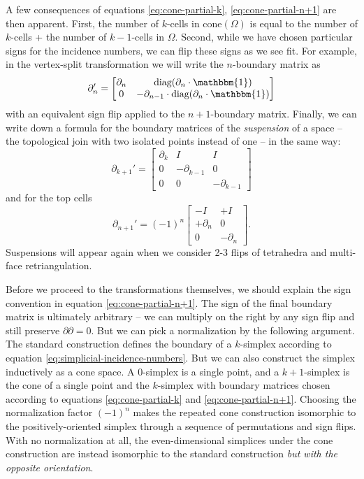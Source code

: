 \documentclass[twocolumn]{article}
\begin{document}
A few consequences of equations \eqref{eq:cone-partial-k}, \eqref{eq:cone-partial-n+1} are then apparent.
First, the number of $k$-cells in $\text{cone}(\Omega)$ is equal to the number of $k$-cells + the number of $k - 1$-cells in $\Omega$.
Second, while we have chosen particular signs for the incidence numbers, we can flip these signs as we see fit.
For example, in the vertex-split transformation we will write the $n$-boundary matrix as
\begin{equation}
    \partial_n' = \left[\begin{matrix}\partial_n & \text{diag}(\partial_n\cdot\mathbbm{1}) \\ 0 & -\partial_{n - 1}\cdot\text{diag}(\partial_n\cdot\mathbbm{1})\end{matrix}\right]
\end{equation}
with an equivalent sign flip applied to the $n + 1$-boundary matrix.
Finally, we can write down a formula for the boundary matrices of the \emph{suspension} of a space -- the topological join with two isolated points instead of one -- in the same way:
\begin{equation}
    \partial_{k + 1}' = \left[\begin{matrix}\partial_k & I & I \\ 0 & -\partial_{k - 1} & 0 \\ 0 & 0 & -\partial_{k - 1}\end{matrix}\right]
\end{equation}
and for the top cells
\begin{equation}
    \partial_{n + 1}' = (-1)^n\left[\begin{matrix}-I & +I \\ +\partial_n & 0 \\ 0 & -\partial_n\end{matrix}\right].
\end{equation}
Suspensions will appear again when we consider 2-3 flips of tetrahedra and multi-face retriangulation.

Before we proceed to the transformations themselves, we should explain the sign convention in equation \eqref{eq:cone-partial-n+1}.
The sign of the final boundary matrix is ultimately arbitrary -- we can multiply on the right by any sign flip and still preserve $\partial\partial = 0$.
But we can pick a normalization by the following argument.
The standard construction defines the boundary of a $k$-simplex according to equation \eqref{eq:simplicial-incidence-numbers}.
But we can also construct the simplex inductively as a cone space.
A 0-simplex is a single point, and a $k + 1$-simplex is the cone of a single point and the $k$-simplex with boundary matrices chosen according to equations \eqref{eq:cone-partial-k} and \eqref{eq:cone-partial-n+1}.
Choosing the normalization factor $(-1)^n$ makes the repeated cone construction isomorphic to the positively-oriented simplex through a sequence of permutations and sign flips.
With no normalization at all, the even-dimensional simplices under the cone construction are instead isomorphic to the standard construction \emph{but with the opposite orientation}.
\end{document}
